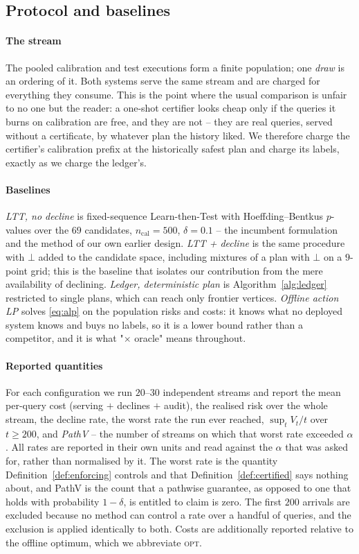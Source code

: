\subsection{Protocol and baselines}
\label{sec:protocol}

\paragraph{The stream}
The pooled calibration and test executions form a finite population; one
\emph{draw} is an ordering of it. Both systems serve the same stream and
are charged for everything they consume. This is the point where the
usual comparison is unfair to no one but the reader: a one-shot
certifier looks cheap only if the queries it burns on calibration are
free, and they are not -- they are real queries, served without a
certificate, by whatever plan the history liked. We therefore charge the
certifier's calibration prefix at the historically safest plan and
charge its labels, exactly as we charge the ledger's.

\paragraph{Baselines}
\emph{LTT, no decline} is fixed-sequence Learn-then-Test
\citep{angelopoulos2021ltt} with Hoeffding--Bentkus $p$-values over the
$69$ candidates, $n_{\mathrm{cal}} = 500$, $\delta = 0.1$ -- the
incumbent formulation and the method of our own earlier design.
\emph{LTT + decline} is the same procedure with $\bot$ added to the
candidate space, including mixtures of a plan with $\bot$ on a
$9$-point grid; this is the baseline that isolates our contribution from
the mere availability of declining. \emph{Ledger, deterministic plan} is
Algorithm~\ref{alg:ledger} restricted to single plans, which can reach
only frontier vertices. \emph{Offline action LP} solves \eqref{eq:alp}
on the population risks and costs: it knows what no deployed system
knows and buys no labels, so it is a lower bound rather than a
competitor, and it is what "$\times$ oracle" means throughout.

\paragraph{Reported quantities}
For each configuration we run $20$--$30$ independent streams and report
the mean per-query cost (serving $+$ declines $+$ audit), the realised
risk over the whole stream, the decline rate, the worst rate the run
ever reached, $\sup_t V_t/t$ over $t \ge 200$, and \emph{PathV} -- the
number of streams on which that worst rate exceeded $\alpha$. All rates
are reported in their own units and read against the $\alpha$ that was
asked for, rather than normalised by it. The worst rate is the quantity
Definition~\ref{def:enforcing} controls and that
Definition~\ref{def:certified} says nothing about, and PathV is the
count that a pathwise guarantee, as opposed to one that holds with
probability $1-\delta$, is entitled to claim is zero. The first $200$
arrivals are excluded because no method can control a rate over a
handful of queries, and the exclusion is applied identically to both.
Costs are additionally reported relative to the offline optimum, which
we abbreviate \textsc{opt}.
